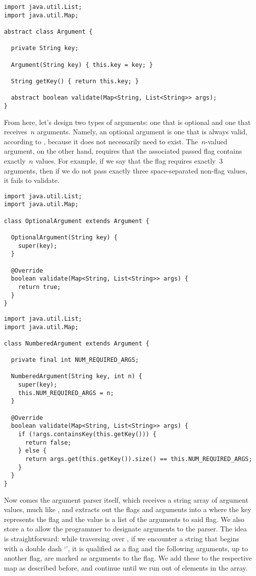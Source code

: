 \enlargethispage{-3\baselineskip}
\begin{lstlisting}[language=MyJava]
import java.util.List;
import java.util.Map;

abstract class Argument {

  private String key;

  Argument(String key) { this.key = key; }

  String getKey() { return this.key; }

  abstract boolean validate(Map<String, List<String>> args);
}
\end{lstlisting}

From here, let's design two types of arguments: one that is optional and one that receives~$n$ arguments. Namely, an optional argument is one that is always valid, according to , because it does not necessarily need to exist. The~$n$-valued argument, on the other hand, requires that the associated passed flag contains exactly~$n$ values. For example, if we say that the  flag requires exactly~$3$ arguments, then if we do not pass exactly three space-separated non-flag values, it fails to validate.


\begin{lstlisting}[language=MyJava]
import java.util.List;
import java.util.Map;

class OptionalArgument extends Argument {

  OptionalArgument(String key) { 
    super(key); 
  }

  @Override
  boolean validate(Map<String, List<String>> args) { 
    return true; 
  }
}
\end{lstlisting}

\begin{lstlisting}[language=MyJava]
import java.util.List;
import java.util.Map;

class NumberedArgument extends Argument {

  private final int NUM_REQUIRED_ARGS;

  NumberedArgument(String key, int n) {
    super(key);
    this.NUM_REQUIRED_ARGS = n;
  }

  @Override
  boolean validate(Map<String, List<String>> args) {
    if (!args.containsKey(this.getKey())) { 
      return false; 
    } else { 
      return args.get(this.getKey()).size() == this.NUM_REQUIRED_ARGS; 
    }
  }
}
\end{lstlisting}

Now comes the argument parser itself, which receives a string array of argument values, much like , and extracts out the flags and arguments into a  where the key represents the flag and the value is a list of the arguments to said flag. We also store a  to allow the programmer to designate arguments to the parser. The idea is straightforward: while traversing over , if we encounter a string that begins with a double dash `\ttt{--}', it is qualified as a flag and the following arguments, up to another flag, are marked as arguments to the flag. We add these to the respective map as described before, and continue until we run out of elements in the array.


